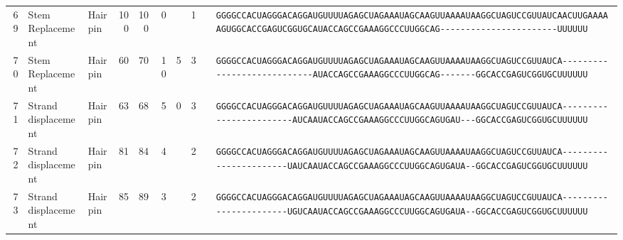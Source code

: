 \begin{tabular}{rllrrrrrcl}
 69 & Stem Replacement & Hairpin & 100 & 100 & 0 &  & 1 &  &
 \color{ucsfdarkgrey}\verb|GGGGCCACUAGGGACAGGAU|\color{ucsforange}\verb|GUUUUA|\color{ucsfblue}\verb|GAGCUAGAAAUAGCAAGU|\color{ucsforange}\verb|UAAAAUAA|\color{ucsfnavy}\verb|GGCUAGUCCGU|\color{ucsforange}\verb|UAUCA|\color{ucsfteal}\verb|ACUUGAAAAAGU|\color{ucsforange}\verb|GGCACCGAGUCGGUGC|\color{ucsfpurple}\verb|AUACCAGCCGAAAGGCCCUUGGCAG|\color{ucsforange}\verb|-----------------------UUUUUU| \\

 70 & Stem Replacement & Hairpin & 60 & 70 & 10 & 5 & 3 &  &
 \color{ucsfdarkgrey}\verb|GGGGCCACUAGGGACAGGAU|\color{ucsforange}\verb|GUUUUA|\color{ucsfblue}\verb|GAGCUAGAAAUAGCAAGU|\color{ucsforange}\verb|UAAAAUAA|\color{ucsfnavy}\verb|GGCUAGUCCGU|\color{ucsforange}\verb|UAUCA|\color{ucsfteal}\verb|----------------------------|\color{ucsfpurple}\verb|AUACCAGCCGAAAGGCCCUUGGCAG|\color{ucsfteal}\verb|-------|\color{ucsforange}\verb|GGCACCGAGUCGGUGCUUUUUU| \\

 71 & Strand displacement & Hairpin & 63 & 68 & 5 & 0 & 3 &  &
 \color{ucsfdarkgrey}\verb|GGGGCCACUAGGGACAGGAU|\color{ucsforange}\verb|GUUUUA|\color{ucsfblue}\verb|GAGCUAGAAAUAGCAAGU|\color{ucsforange}\verb|UAAAAUAA|\color{ucsfnavy}\verb|GGCUAGUCCGU|\color{ucsforange}\verb|UAUCA|\color{ucsfteal}\verb|------------------------AUCA|\color{ucsfpurple}\verb|AUACCAGCCGAAAGGCCCUUGGCAG|\color{ucsfteal}\verb|UGAU---|\color{ucsforange}\verb|GGCACCGAGUCGGUGCUUUUUU| \\

 72 & Strand displacement & Hairpin & 81 & 84 & 4 &   & 2 &  &
 \color{ucsfdarkgrey}\verb|GGGGCCACUAGGGACAGGAU|\color{ucsforange}\verb|GUUUUA|\color{ucsfblue}\verb|GAGCUAGAAAUAGCAAGU|\color{ucsforange}\verb|UAAAAUAA|\color{ucsfnavy}\verb|GGCUAGUCCGU|\color{ucsforange}\verb|UAUCA|\color{ucsfteal}\verb|-----------------------UAUCA|\color{ucsfpurple}\verb|AUACCAGCCGAAAGGCCCUUGGCAG|\color{ucsfteal}\verb|UGAUA--|\color{ucsforange}\verb|GGCACCGAGUCGGUGCUUUUUU| \\

 73 & Strand displacement & Hairpin & 85 & 89 & 3 &   & 2 &  &
 \color{ucsfdarkgrey}\verb|GGGGCCACUAGGGACAGGAU|\color{ucsforange}\verb|GUUUUA|\color{ucsfblue}\verb|GAGCUAGAAAUAGCAAGU|\color{ucsforange}\verb|UAAAAUAA|\color{ucsfnavy}\verb|GGCUAGUCCGU|\color{ucsforange}\verb|UAUCA|\color{ucsfteal}\verb|-----------------------UGUCA|\color{ucsfpurple}\verb|AUACCAGCCGAAAGGCCCUUGGCAG|\color{ucsfteal}\verb|UGAUA--|\color{ucsforange}\verb|GGCACCGAGUCGGUGCUUUUUU| \\


\end{tabular}
